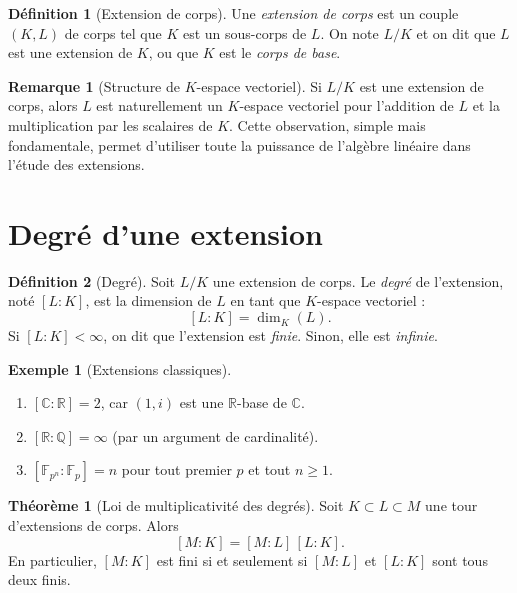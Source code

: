 \documentclass[12pt,a4paper,openany]{book}
\theoremstyle{definition}
\newtheorem{definition}{Définition}[chapter]
\newtheorem{theoreme}{Théorème}[chapter]
\newtheorem{remarque}{Remarque}[chapter]
\newtheorem{exemple}{Exemple}[chapter]
\newcommand{\Q}{\mathbb{Q}}
\newcommand{\R}{\mathbb{R}}
\newcommand{\C}{\mathbb{C}}
\newcommand{\F}{\mathbb{F}}
\begin{document}
\begin{definition}[Extension de corps]\label{def:extension}
Une \emph{extension de corps} est un couple $(K, L)$ de corps tel que $K$ est
un sous-corps de $L$. On note $L/K$ et on dit que $L$ est une extension de $K$,
ou que $K$ est le \emph{corps de base}.
\end{definition}

\begin{remarque}[Structure de $K$-espace vectoriel]
\label{rem:espace-vectoriel}
Si $L/K$ est une extension de corps, alors $L$ est naturellement un $K$-espace
vectoriel pour l'addition de $L$ et la multiplication par les scalaires de $K$.
Cette observation, simple mais fondamentale, permet d'utiliser toute la puissance
de l'algèbre linéaire dans l'étude des extensions.
\end{remarque}

\section{Degré d'une extension}
\label{sec:degre}

\begin{definition}[Degré]\label{def:degre}
Soit $L/K$ une extension de corps. Le \emph{degré} de l'extension, noté $[L:K]$,
est la dimension de $L$ en tant que $K$-espace vectoriel :
\[
  [L:K] = \dim_K(L).
\]
Si $[L:K] < \infty$, on dit que l'extension est \emph{finie}. Sinon, elle est \emph{infinie}.
\end{definition}

\begin{exemple}[Extensions classiques]\label{ex:extensions-classiques}
\begin{enumerate}[label=(\alph*)]
  \item $[\C:\R] = 2$, car $(1,i)$ est une $\R$-base de $\C$.
  \item $[\R:\Q] = \infty$ (par un argument de cardinalité).
  \item $[\F_{p^n}:\F_p] = n$ pour tout premier $p$ et tout $n \geq 1$.
\end{enumerate}
\end{exemple}

\begin{theoreme}[Loi de multiplicativité des degrés]\label{thm:tour}
Soit $K \subset L \subset M$ une tour d'extensions de corps. Alors
\[
  [M:K] = [M:L]\,[L:K].
\]
En particulier, $[M:K]$ est fini si et seulement si $[M:L]$ et $[L:K]$ sont
tous deux finis.
\end{theoreme}
\end{document}
